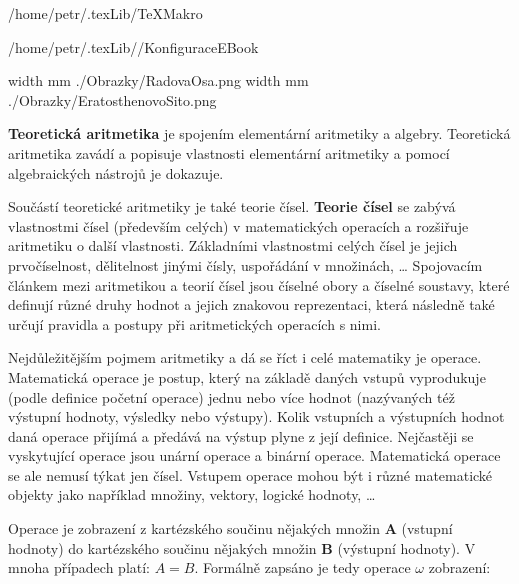 
\def\addr{/home/petr/.texLib/}
%
%
%

 \addr TeXMakro
\setAddress{\addr}

 \addr/KonfiguraceEBook

\pdfximage width \the\SirkaOdstavce mm {./Obrazky/RadovaOsa.png}
\pdfximage width \the\SirkaOdstavce mm {./Obrazky/EratosthenovoSito.png}




\Obsah

{\bf Teoretická aritmetika} je spojením elementární aritmetiky a algebry. Teoretická aritmetika zavádí a popisuje vlastnosti elementární aritmetiky a pomocí algebraických nástrojů je dokazuje.

Součástí teoretické aritmetiky je také teorie čísel. {\bf Teorie čísel} se zabývá vlastnostmi čísel (především celých) v matematických operacích a rozšiřuje aritmetiku o další vlastnosti. Základními vlastnostmi celých čísel je jejich prvočíselnost, dělitelnost jinými čísly, uspořádání v množinách, …
Spojovacím článkem mezi aritmetikou a teorií čísel jsou číselné obory a číselné soustavy, které definují různé druhy hodnot a jejich znakovou reprezentaci, která následně také určují pravidla a postupy při aritmetických operacích s nimi.


Nejdůležitějším pojmem aritmetiky a dá se říct i celé matematiky je operace. Matematická operace je postup, který na základě daných vstupů vyprodukuje (podle definice početní operace) jednu nebo více hodnot (nazývaných též výstupní hodnoty, výsledky nebo výstupy). Kolik vstupních a výstupních hodnot daná operace přijímá a předává na výstup plyne z její definice. Nejčastěji se vyskytující operace jsou unární operace a binární operace. Matematická operace se ale nemusí týkat jen čísel. Vstupem operace mohou být i různé matematické objekty jako například množiny, vektory, logické hodnoty, …

Operace je zobrazení z kartézského součinu nějakých množin {\bf A} (vstupní hodnoty) do kartézského součinu nějakých množin {\bf B} (výstupní hodnoty). V mnoha případech platí: $A = B$. Formálně zapsáno je tedy operace $ \omega $ zobrazení:

